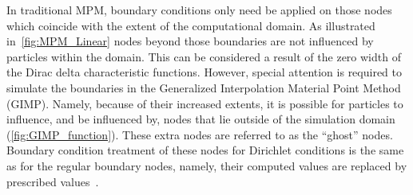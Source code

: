 In traditional MPM, boundary conditions only need be applied on those nodes 
which coincide with the extent of the computational domain. As  illustrated 
in~\cref{fig:MPM_Linear} nodes beyond those boundaries are not influenced by 
particles within the domain. This can be considered a result of the zero
width of the Dirac delta characteristic functions. However, special attention 
is required to simulate the boundaries in the Generalized Interpolation 
Material Point Method (GIMP). Namely, because of their increased extents, it is 
possible for particles to influence, and be influenced by, nodes that lie 
outside of the simulation domain (\cref{fig:GIMP_function}). These extra nodes 
are referred to as the ``ghost'' nodes. Boundary condition treatment of these 
nodes for Dirichlet conditions is the same as for the regular boundary
nodes, namely, their computed values are replaced by prescribed 
values~\citep{Steffen2008}.


